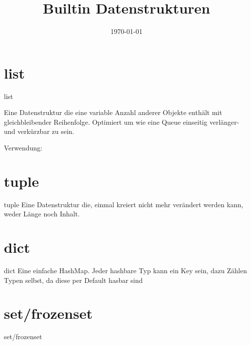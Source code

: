 
\newcommand{\topic}{
	Builtin Datenstrukturen
}

\title{\topic}
\supertitle{\course}
\date{\today}



\maketitle

\begin{frame}
	\tableofcontents
\end{frame}

\section{list}
\begin{frame}{list}

Eine Datenstruktur die eine variable Anzahl anderer Objekte enthält mit gleichbleibender Reihenfolge. Optimiert um wie eine Queue einseitig verlänger-und verkürzbar zu sein.

Verwendung:



\end{frame}


\section{tuple}
\begin{frame}{tuple}
Eine Datenstruktur die, einmal kreiert nicht mehr verändert werden kann, weder Länge noch Inhalt.
\end{frame}

\section{dict}
\begin{frame}{dict}
	Eine einfache HashMap. Jeder hashbare Typ kann ein Key sein, dazu Zählen Typen selbst, da diese per Default hasbar sind
\end{frame}

\section{set/frozenset}
\begin{frame}{set/frozenset}
\end{frame}


